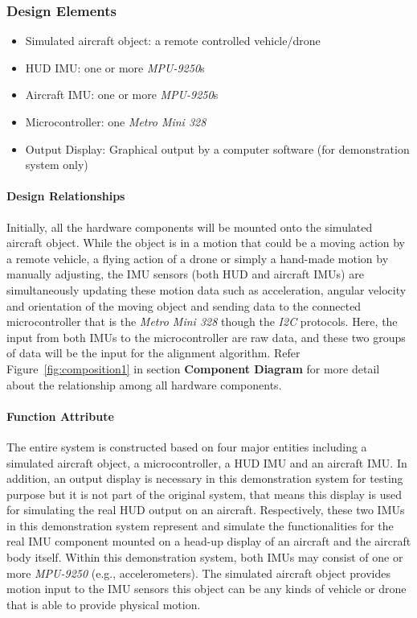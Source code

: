 		\subsubsection{Design Elements}
			\begin{itemize}
				\item Simulated aircraft object: a remote controlled vehicle/drone
				\item HUD IMU: one or more \textit{MPU-9250}s
				\item Aircraft IMU: one or more \textit{MPU-9250}s
				\item Microcontroller: one \textit{Metro Mini 328}
				\item Output Display: Graphical output by a computer software (for demonstration system only)\\
			\end{itemize}

			\paragraph{Design Relationships}
			Initially, all the hardware components will be mounted onto the simulated aircraft object. While the object is in a motion that could be a moving action by a remote vehicle, a flying action of a drone or simply a hand-made motion by manually adjusting, the IMU sensors (both HUD and aircraft IMUs) are simultaneously updating these motion data such as acceleration, angular velocity and orientation of the moving object and sending data to the connected microcontroller that is the \textit{Metro Mini 328} though the \textit{I2C} protocols. Here, the input from both IMUs to the microcontroller are raw data, and these two groups of data will be the input for the alignment algorithm. Refer Figure~\ref{fig:composition1} in section \textbf{Component Diagram} for more detail about the relationship among all hardware components.\\

			\paragraph{Function Attribute}
			The entire system is constructed based on four major entities including a simulated aircraft object, a microcontroller, a HUD IMU and an aircraft IMU. In addition, an output display is necessary in this demonstration system for testing purpose but it is not part of the original system, that means this display is used for simulating the real HUD output on an aircraft. Respectively, these two IMUs in this demonstration system represent and simulate the functionalities for the real IMU component mounted on a head-up display of an aircraft and the aircraft body itself. Within this demonstration system, both IMUs may consist of one or more \textit{MPU-9250} (e.g., accelerometers). The simulated aircraft object provides motion input to the IMU sensors this object can be any kinds of vehicle or drone that is able to provide physical motion.

